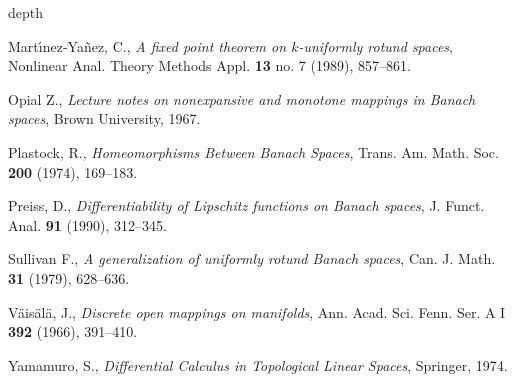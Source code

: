 \documentclass[a4, 12pt,leqno]{amsart}
\theoremstyle{plain}
\theoremstyle{definition}
\theoremstyle{remark}
\numberwithin{equation}{section}
\begin{document}
\begin{thebibliography}{depth}








Mart\'{\i}nez-Ya\~nez, C.,
\textit{A fixed point theorem on $k$-uniformly rotund spaces},
Nonlinear Anal. Theory Methods Appl. {\bf 13} no. 7 (1989), 857--861.

Opial Z.,
\textit{Lecture notes on nonexpansive and monotone mappings in Banach spaces}, Brown University, 1967.


Plastock, R., 
\textit{Homeomorphisms Between Banach Spaces}, 
Trans. Am. Math. Soc. {\bf 200} (1974), 169--183. 

Preiss, D.,
\textit{Differentiability of Lipschitz functions on Banach spaces},
J. Funct. Anal. {\bf 91} (1990), 312--345. 

Sullivan F., 
\textit{A generalization of uniformly rotund Banach spaces}, Can. J. Math. {\bf 31} (1979), 628--636.

V\"{a}is\"{a}l\"{a}, J.,
\textit{Discrete open mappings on manifolds},
Ann. Acad. Sci. Fenn. Ser. A I {\bf 392} (1966), 391--410. 

Yamamuro, S.,
\textit{Differential Calculus in Topological Linear Spaces},
Springer, 1974.


  








\end{thebibliography}
	
	
	
\end{document}
